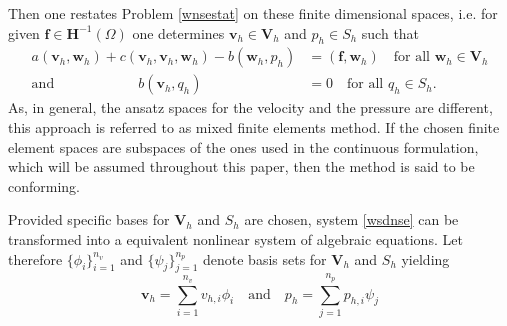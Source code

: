 \documentclass[a4paper,10pt,BCOR=15mm]{scrbook}
\providecommand{\andi}[0]{\quad \text{and} \quad}
\begin{document}
Then one restates Problem \ref{wnsestat} on these finite dimensional spaces, i.e. for given $\mathbf f \in \mathbf H^{-1}(\Omega)$ one determines $\mathbf v_h \in \mathbf  V_h$ and $p_h \in S_h$ such that 
\begin{subequations}\label{wsdnse}
\begin{align}
 a(\mathbf v_h, \mathbf w_h) + c(\mathbf v_h,\mathbf v_h, \mathbf w_h)-b(\mathbf w_h, p_h)&=(\mathbf f, \mathbf w_h) \quad \text{for all } \mathbf w_h \in \mathbf V_h \\
\text{and} \quad \quad \quad \quad \quad \quad b(\mathbf v_h, q_h) &= 0 \quad \text{for all } q_h \in S_h.
\end{align}
\end{subequations}
As, in general, the ansatz spaces for the velocity and the pressure are different, this approach is referred to as mixed finite elements method. If the chosen finite element spaces are subspaces of the ones used in the continuous formulation, which will be assumed throughout this paper, then the method is said to be conforming. 

Provided specific bases for $\mathbf V_h$ and $S_h$ are chosen, system \eqref{wsdnse} can be transformed into a equivalent nonlinear system of algebraic equations. Let therefore $\{ \phi _i \}_{i=1}^{n_v}$ and $\{ \psi _j \}_{j=1}^{n_p}$ denote basis sets for $\mathbf V_h$ and $S_h$ yielding
\begin{equation*}
 \mathbf v_h = \sum _{i=1}^{n_v} v_{h,i} \phi_i \andi{} p_h = \sum _{j=1}^{n_p} p_{h,i} \psi_j
\end{equation*}
\end{document}
